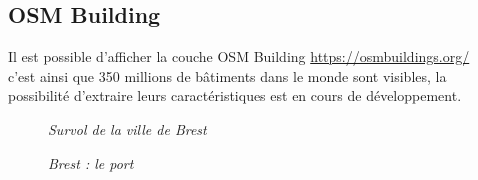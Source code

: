 \subsection{OSM Building}
Il est possible d'afficher la couche OSM Building \href{https://osmbuildings.org/}{https://osmbuildings.org/} \\
c'est ainsi que 350 millions de bâtiments dans le monde sont visibles, la possibilité d'extraire leurs caractéristiques est en cours de développement.
\begin{center}
\begin{figure}[ht]
\caption{\label{equiProj}\textit{Survol de la ville de Brest}}
\end{figure}
\end{center}
\begin{center}
\begin{figure}[ht]
\caption{\label{equiProj}\textit{Brest : le port}}
\end{figure}
\end{center}
